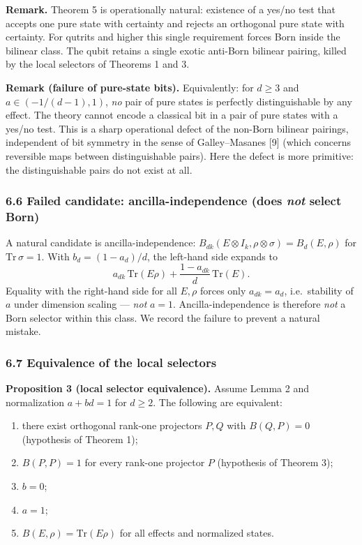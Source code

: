 \documentclass[
]{article}
\providecommand{\tightlist}{%
  \setlength{\itemsep}{0pt}\setlength{\parskip}{0pt}}
\begin{document}
\textbf{Remark.} Theorem 5 is operationally natural: existence of a
yes/no test that accepts one pure state with certainty and rejects an
orthogonal pure state with certainty. For qutrits and higher this single
requirement forces Born inside the bilinear class. The qubit retains a
single exotic anti-Born bilinear pairing, killed by the local selectors
of Theorems 1 and 3.

\textbf{Remark (failure of pure-state bits).} Equivalently: for
\(d\geq 3\) and \(a\in(-1/(d-1),1)\), \emph{no} pair of pure states is
perfectly distinguishable by any effect. The theory cannot encode a
classical bit in a pair of pure states with a yes/no test. This is a
sharp operational defect of the non-Born bilinear pairings, independent
of bit symmetry in the sense of Galley--Masanes {[}9{]} (which concerns
reversible maps between distinguishable pairs). Here the defect is more
primitive: the distinguishable pairs do not exist at all.

\subsubsection{\texorpdfstring{6.6 Failed candidate:
ancilla-independence (does \emph{not} select
Born)}{6.6 Failed candidate: ancilla-independence (does not select Born)}}\label{failed-candidate-ancilla-independence-does-not-select-born}

A natural candidate is ancilla-independence:
\(B_{dk}(E\otimes I_k,\rho\otimes\sigma)=B_d(E,\rho)\) for
\(\mathrm{Tr}\,\sigma=1\). With \(b_d=(1-a_d)/d\), the left-hand side
expands to
\[a_{dk}\,\mathrm{Tr}(E\rho)+\frac{1-a_{dk}}{d}\,\mathrm{Tr}(E).\]
Equality with the right-hand side for all \(E,\rho\) forces only
\(a_{dk}=a_d\), i.e.~stability of \(a\) under dimension scaling ---
\emph{not} \(a=1\). Ancilla-independence is therefore \emph{not} a Born
selector within this class. We record the failure to prevent a natural
mistake.

\subsubsection{6.7 Equivalence of the local
selectors}\label{equivalence-of-the-local-selectors}

\textbf{Proposition 3 (local selector equivalence).} Assume Lemma 2 and
normalization \(a+bd=1\) for \(d\geq 2\). The following are equivalent:

\begin{enumerate}
\def\labelenumi{\arabic{enumi}.}
\tightlist
\item
  there exist orthogonal rank-one projectors \(P,Q\) with \(B(Q,P)=0\)
  (hypothesis of Theorem 1);
\item
  \(B(P,P)=1\) for every rank-one projector \(P\) (hypothesis of Theorem
  3);
\item
  \(b=0\);
\item
  \(a=1\);
\item
  \(B(E,\rho)=\mathrm{Tr}(E\rho)\) for all effects and normalized
  states.
\end{enumerate}
\end{document}
